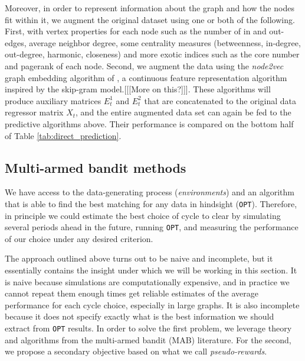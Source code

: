 \documentclass[format=acmsmall, review=false]{acmart}
\begin{document}
Moreover, in order to represent information about the graph and how the nodes fit within it, we augment the original dataset using one or both of the following. First, with vertex properties for each node such as the number of in and out-edges, average neighbor degree, some centrality measures (betweenness, in-degree, out-degree, harmonic, closeness) and more exotic indices such as the core number and pagerank of each node\cite{newman2010networks}. Second, we augment the data using the \emph{node2vec} graph embedding algorithm of \cite{grover2016node2vec}, a continuous feature representation algorithm inspired by the skip-gram model.[[[More on this?]]]. These algorithms will produce auxiliary matrices $E_t^{1}$ and $E_t^2$ that are concatenated to the original data regressor matrix $X_t$, and the entire augmented data set can again be fed to the predictive algorithms above. Their performance is compared on the bottom half of Table \ref{tab:direct_prediction}.


\subsection{Multi-armed bandit methods}

We have access to the data-generating process (\emph{environments}) and an algorithm that is able to find the best matching for any data in hindsight (\texttt{OPT}). Therefore, in principle we could estimate the best choice of cycle to clear by simulating several periods ahead in the future, running \texttt{OPT}, and measuring the performance of our choice under any desired criterion. 

The approach outlined above turns out to be naive and incomplete, but it essentially contains the insight under which we will be working in this section. It is naive because simulations are computationally expensive, and in practice we cannot repeat them enough times get reliable estimates of the average performance for each cycle choice, especially in large graphs. It is also incomplete because it does not specify exactly what is the best information we should extract from \texttt{OPT} results. In order to solve the first problem, we leverage theory and algorithms from the multi-armed bandit (MAB) literature. For the second, we propose a secondary objective based on what we call \emph{pseudo-rewards}.
\end{document}

